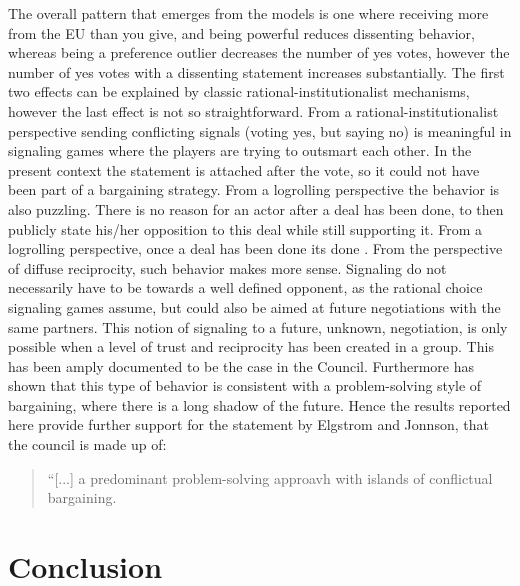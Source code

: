 The overall pattern that emerges from the models is one where receiving more from the EU than you give, and being powerful reduces dissenting behavior, whereas being a preference outlier decreases the number of yes votes, however the number of yes votes with a dissenting statement increases substantially. The first two effects can be explained by classic rational-institutionalist mechanisms, however the last effect is not so straightforward. From a rational-institutionalist perspective sending conflicting signals (voting yes, but saying no) is meaningful in signaling games where the players are trying to outsmart each other. In the present context the statement is attached after the vote, so it could not have been part of a bargaining strategy. From a logrolling perspective the behavior is also puzzling. There is no reason for an actor after a deal has been done, to then publicly state his/her opposition to this deal while still supporting it. From a logrolling perspective, once a deal has been done its done \citep{Warntjen2010}. From the perspective of diffuse reciprocity, such behavior makes more sense. Signaling do not necessarily have to be towards a well defined opponent, as the rational choice signaling games assume, but could also be aimed at future negotiations with the same partners. This notion of signaling to a future, unknown, negotiation, is only possible when a level of trust and reciprocity has been created in a group. This has been amply documented to be the case in the Council. Furthermore \citet{ElgstromJonsson2000} has shown that this type of behavior is consistent with a problem-solving style of bargaining, where there is a long shadow of the future. Hence the results reported here provide further support for the statement by Elgstrom and Jonnson, that the council is made up of:

\begin{quote}
  ``[...] a predominant problem-solving approavh with islands of conflictual bargaining.
\end{quote}

\section{Conclusion}

